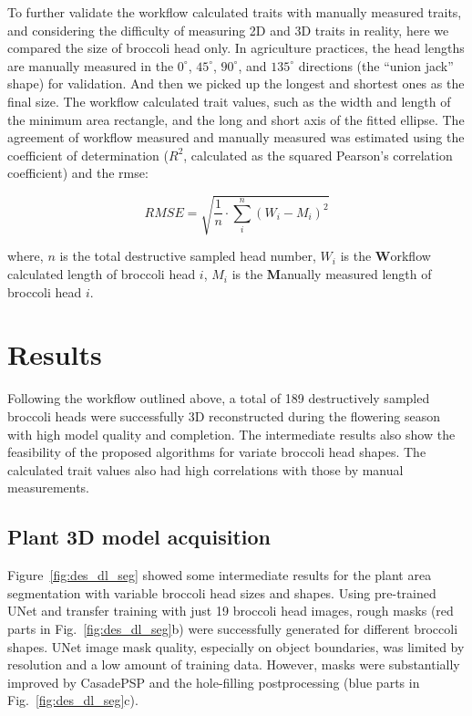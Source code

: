 To further validate the workflow calculated traits with manually measured traits, and considering the difficulty of measuring 2D and 3D traits in reality, here we compared the size of broccoli head only. In agriculture practices, the head lengths are manually measured in the $0^\circ$, $45^\circ$, $90^\circ$, and $135^\circ$ directions (the ``union jack'' shape) for validation. And then we picked up the longest and shortest ones as the final size. The workflow calculated trait values, such as the width and length of the minimum area rectangle, and the long and short axis of the fitted ellipse. The agreement of workflow measured and manually measured was estimated using the coefficient of determination ($R^2$, calculated as the squared Pearson's correlation coefficient) and the \gls{rmse}:

\begin{equation}
  RMSE = \sqrt{\frac{1}{n} \cdot \sum_{i}^{n} (W_{i} - M_{i})^2}
\end{equation}

\noindent
where, $n$ is the total destructive sampled head number, $W_{i}$ is the \textbf{W}orkflow calculated length of broccoli head $i$, $M_{i}$ is the \textbf{M}anually measured length of broccoli head $i$.

\section{Results}

Following the workflow outlined above, a total of 189 destructively sampled broccoli heads were successfully 3D reconstructed during the flowering season with high model quality and completion. The intermediate results also show the feasibility of the proposed algorithms for variate broccoli head shapes. The calculated trait values also had high correlations with those by manual measurements.

\subsection{Plant 3D model acquisition}

Figure~\ref{fig:des_dl_seg} showed some intermediate results for the plant area segmentation with variable broccoli head sizes and shapes. Using pre-trained UNet and transfer training with just 19 broccoli head images, rough masks (red parts in Fig.~\ref{fig:des_dl_seg}b) were successfully generated for different broccoli shapes. UNet image mask quality, especially on object boundaries, was limited by resolution and a low amount of training data. However, masks were substantially improved by CasadePSP and the hole-filling postprocessing (blue parts in Fig.~\ref{fig:des_dl_seg}c).

